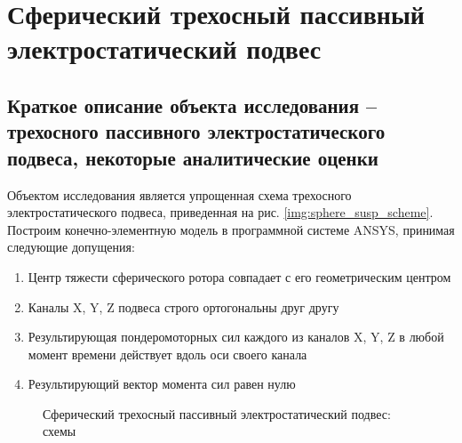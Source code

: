\chapter{Сферический трехосный пассивный электростатический подвес} \label{chapt3}



\section{Краткое описание объекта исследования – трехосного пассивного электростатического подвеса, некоторые аналитические оценки} \label{sect3_1}

Объектом исследования является упрощенная схема трехосного электростатического подвеса, приведенная на рис. \ref{img:sphere_susp_scheme}. Построим конечно-элементную модель в программной системе ANSYS, принимая следующие допущения:
\begin{enumerate}
  \item Центр тяжести сферического ротора совпадает с его геометрическим центром
  \item Каналы X, Y, Z подвеса строго ортогональны друг другу
  \item Результирующая пондеромоторных сил каждого из каналов X, Y, Z в любой момент времени действует вдоль оси своего канала
  \item Результирующий вектор момента сил равен нулю
\end{enumerate}

\begin{figure}[ht]
    {\centering
        \hfill
        \hfill
        \hfill
    }
    \caption{Сферический трехосный пассивный электростатический подвес: схемы}
    \label{img:sphere_susp_schemes}
\end{figure}


